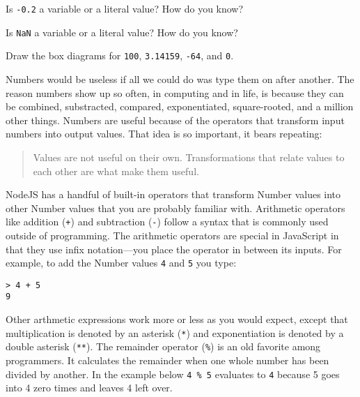 \begin{question}
  Is \texttt{-0.2} a variable or a literal value? How do you know?
\end{question}

\begin{question}
  Is \texttt{NaN} a variable or a literal value? How do you know?
\end{question}

\begin{question}
  Draw the box diagrams for \texttt{100}, \texttt{3.14159}, \texttt{-64}, and \texttt{0}.
\end{question}

Numbers would be useless if all we could do was type them on after another. The reason numbers show up so often, in computing and in life, is because they can be combined, substracted, compared, exponentiated, square-rooted, and a million other things. Numbers are useful because of the operators that transform input numbers into output values. That idea is so important, it bears repeating:

\begin{quotation}
  Values are not useful on their own. Transformations that relate values to each other are what make them useful.
\end{quotation}

NodeJS has a handful of built-in operators that transform \textsf{Number} values into other \textsf{Number} values that you are probably familiar with. Arithmetic operators like addition (\texttt{+}) and subtraction (\texttt{-}) follow a syntax that is commonly used outside of programming. The arithmetic operators are special in JavaScript in that they use infix notation---you place the operator in between its inputs. For example, to add the \textsf{Number} values \texttt{4} and \texttt{5} you type:

\suppresslinenumbers
\begin{lstlisting}
> 4 + 5
9
\end{lstlisting}

Other arthmetic expressions work more or less as you would expect, except that multiplication is denoted by an asterisk (\texttt{*}) and exponentiation is denoted by a double asterisk (\texttt{**}). The remainder operator (\texttt{\%}) is an old favorite among programmers. It calculates the remainder when one whole number has been divided by another. In the example below \texttt{4 \% 5} evaluates to \texttt{4} because 5 goes into 4 zero times and leaves 4 left over.

